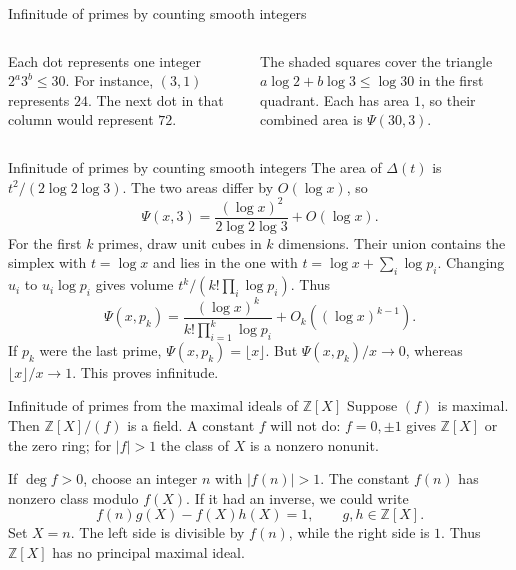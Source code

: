 \documentclass[aspectratio=169,11pt]{beamer}
\newcommand{\Z}{\mathbb Z}
\begin{document}
\begin{frame}{Infinitude of primes by counting smooth integers}
\begin{columns}
Each dot represents one integer $2^a3^b\le30$. For instance, $(3,1)$ represents $24$. The next dot in that column would represent $72$.

The shaded squares cover the triangle $a\log2+b\log3\le\log30$ in the first quadrant. Each has area $1$, so their combined area is $\Psi(30,3)$.
\end{columns}
\end{frame}
\begin{frame}{Infinitude of primes by counting smooth integers}
The area of $\Delta(t)$ is $t^2/(2\log2\log3)$. The two areas differ by $O(\log x)$, so
\[\Psi(x,3)=\frac{(\log x)^2}{2\log2\log3}+O(\log x).\]
For the first $k$ primes, draw unit cubes in $k$ dimensions. Their union contains the simplex with $t=\log x$ and lies in the one with $t=\log x+\sum_i\log p_i$. Changing $u_i$ to $u_i\log p_i$ gives volume $t^k/(k!\prod_i\log p_i)$. Thus
\[\Psi(x,p_k)=\frac{(\log x)^k}{k!\prod_{i=1}^k\log p_i}+O_k((\log x)^{k-1}).\]
If $p_k$ were the last prime, $\Psi(x,p_k)=\lfloor x\rfloor$. But $\Psi(x,p_k)/x\to0$, whereas $\lfloor x\rfloor/x\to1$. This proves infinitude.
\end{frame}
\begin{frame}{Infinitude of primes from the maximal ideals of $\Z[X]$}
Suppose $(f)$ is maximal. Then $\Z[X]/(f)$ is a field. A constant $f$ will not do: $f=0,\pm1$ gives $\Z[X]$ or the zero ring; for $|f|>1$ the class of $X$ is a nonzero nonunit.

If $\deg f>0$, choose an integer $n$ with $|f(n)|>1$. The constant $f(n)$ has nonzero class modulo $f(X)$. If it had an inverse, we could write
\[f(n)g(X)-f(X)h(X)=1,\qquad g,h\in\Z[X].\]
Set $X=n$. The left side is divisible by $f(n)$, while the right side is $1$. Thus $\Z[X]$ has no principal maximal ideal.
\end{frame}
\end{document}
